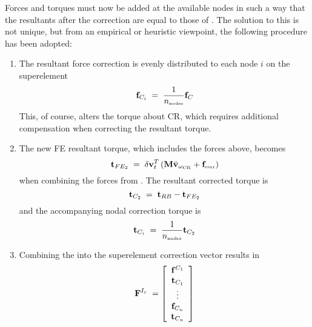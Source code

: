 Forces and torques must now be added at the available nodes in such a way that
the resultants after the correction are equal to those of .
The solution to this is not unique, but from an empirical or heuristic
viewpoint, the following procedure has been adopted:
%
\begin{enumerate}
\item The resultant force correction is evenly distributed to each node $i$
on the superelement
%
\begin{equation}
{\bf f}_{C_i} \;=\; \frac{1}{n_{\mbox{\tiny nodes}}}{\bf f}_C
\label{eq:Fci}
\end{equation}
%
This, of course, alters the torque about CR, which requires additional
compensation when correcting the resultant torque.
%
\item The new FE resultant torque, which includes the forces above, becomes
%
\begin{equation}
{\bf t}_{FE_2} \;=\; \delta{\bf v}_t^T \left(
{\bf M}\ddot{\bf v}_{\omega_{\mbox{\tiny CR}}} + {\bf f}_{\mbox{\tiny corr}}
\right)
\end{equation}
%
when combining the forces from .
The resultant corrected torque is
%
\begin{equation}
{\bf t}_{C_2} \;=\; {\bf t}_{RB} - {\bf t}_{FE_2}
\end{equation}
%
and the accompanying nodal correction torque is
%
\begin{equation}
{\bf t}_{C_i} \;=\; \frac{1}{n_{\mbox{\tiny nodes}}}{\bf t}_{C_2}
\label{eq:Tci}
\end{equation}
%
\item Combining the 
into the superelement correction vector results in
%
\begin{equation}
{\bf F}^{I_c} \;= \left[\begin{array}{c}
{\bf f}^{C_1} \\ {\bf t}_{C_1} \\ \vdots \\ {\bf f}_{C_n} \\ {\bf t}_{C_n}
\end{array}\right]
\end{equation}
%
\end{enumerate}

